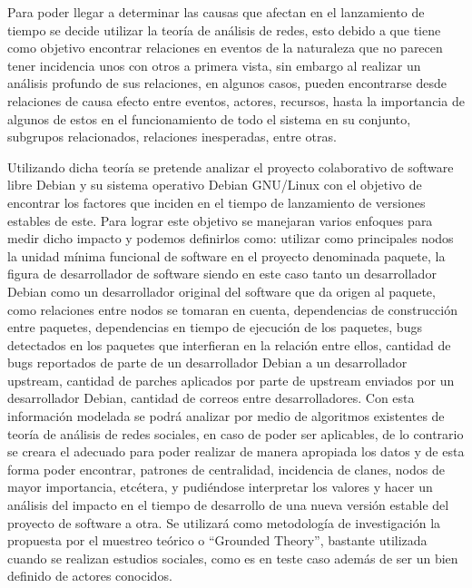\documentclass[12pt]{report}
\begin{document}
Para  poder  llegar  a  determinar   las  causas  que  afectan  en  el
lanzamiento  de tiempo  se decide  utilizar la  teoría de  análisis de
redes, esto debido  a que tiene como objetivo  encontrar relaciones en
eventos  de la  naturaleza que  no parecen  tener incidencia  unos con
otros a primera vista, sin embargo al realizar un análisis profundo de
sus relaciones, en algunos  casos, pueden encontrarse desde relaciones
de causa efecto entre eventos, actores, recursos, hasta la importancia
de algunos  de estos  en el  funcionamiento de todo  el sistema  en su
conjunto, subgrupos relacionados, relaciones inesperadas, entre otras.

Utilizando dicha teoría se  pretende analizar el proyecto colaborativo
de software libre  Debian y su sistema operativo  Debian GNU/Linux con
el objetivo  de encontrar  los factores  que inciden  en el  tiempo de
lanzamiento de versiones estables de  este.  Para lograr este objetivo
se  manejaran  varios enfoques  para  medir  dicho impacto  y  podemos
definirlos  como: utilizar  como  principales nodos  la unidad  mínima
funcional de software en el  proyecto denominada paquete, la figura de
desarrollador de software  siendo en este caso  tanto un desarrollador
Debian como  un desarrollador original  del software que da  origen al
paquete,   como  relaciones   entre  nodos   se  tomaran   en  cuenta,
dependencias de construcción entre paquetes, dependencias en tiempo de
ejecución  de  los  paquetes,  bugs detectados  en  los  paquetes  que
interfieran en la relación entre ellos, cantidad de bugs reportados de
parte de un desarrollador Debian a un desarrollador upstream, cantidad
de  parches   aplicados  por  parte   de  upstream  enviados   por  un
desarrollador Debian, cantidad de  correos entre desarrolladores.  Con
esta información  modelada se podrá  analizar por medio  de algoritmos
existentes de teoría  de análisis de redes sociales, en  caso de poder
ser  aplicables, de  lo contrario  se  creara el  adecuado para  poder
realizar  de  manera  apropiada  los  datos  y  de  esta  forma  poder
encontrar,  patrones de  centralidad, incidencia  de clanes,  nodos de
mayor importancia,  etcétera, y  pudiéndose interpretar los  valores y
hacer un análisis del impacto en  el tiempo de desarrollo de una nueva
versión estable  del proyecto de  software a otra.  Se  utilizará como
metodología de  investigación la propuesta  por el muestreo  teórico o
``Grounded Theory'',  bastante utilizada  cuando se  realizan estudios
sociales, como  es en  teste caso  además de ser  un bien  definido de
actores conocidos.
\end{document}
